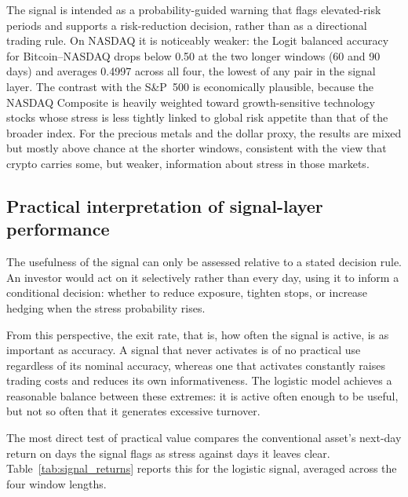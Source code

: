 The signal is intended as a probability-guided warning that flags elevated-risk periods and supports a risk-reduction decision, rather than as a directional trading rule. On NASDAQ it is noticeably weaker: the Logit balanced accuracy for Bitcoin--NASDAQ drops below 0.50 at the two longer windows (60 and 90 days) and averages 0.4997 across all four, the lowest of any pair in the signal layer. The contrast with the S\&P~500 is economically plausible, because the NASDAQ Composite is heavily weighted toward growth-sensitive technology stocks whose stress is less tightly linked to global risk appetite than that of the broader index. For the precious metals and the dollar proxy, the results are mixed but mostly above chance at the shorter windows, consistent with the view that crypto carries some, but weaker, information about stress in those markets.

\subsection{Practical interpretation of signal-layer performance}

The usefulness of the signal can only be assessed relative to a stated decision rule. An investor would act on it selectively rather than every day, using it to inform a conditional decision: whether to reduce exposure, tighten stops, or increase hedging when the stress probability rises.

From this perspective, the exit rate, that is, how often the signal is active, is as important as accuracy. A signal that never activates is of no practical use regardless of its nominal accuracy, whereas one that activates constantly raises trading costs and reduces its own informativeness. The logistic model achieves a reasonable balance between these extremes: it is active often enough to be useful, but not so often that it generates excessive turnover.

The most direct test of practical value compares the conventional asset's next-day return on days the signal flags as stress against days it leaves clear. Table~\ref{tab:signal_returns} reports this for the logistic signal, averaged across the four window lengths.

